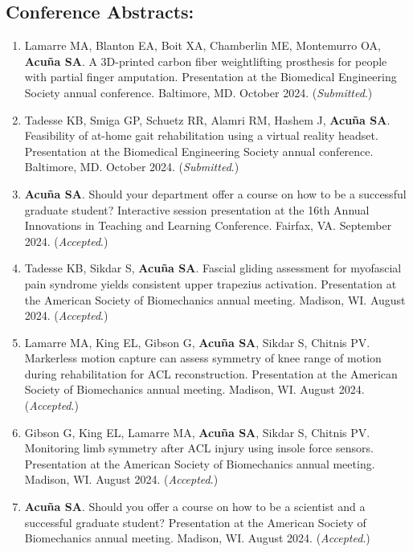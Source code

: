 \documentclass[letterpaper, 10pt]{article}
\begin{document}
\subsection{Conference Abstracts:} %
\begin{enumerate}
    \item Lamarre MA, Blanton EA, Boit XA, Chamberlin ME, Montemurro OA, \textbf{Acuña SA}. A 3D-printed carbon fiber weightlifting prosthesis for people with partial finger amputation. Presentation at the Biomedical Engineering Society annual conference. Baltimore, MD. October 2024. (\textit{Submitted}.)
    \item Tadesse KB, Smiga GP, Schuetz RR, Alamri RM, Hashem J, \textbf{Acuña SA}. Feasibility of at-home gait rehabilitation using a virtual reality headset. Presentation at the Biomedical Engineering Society annual conference. Baltimore, MD. October 2024. (\textit{Submitted}.)
    \item \textbf{Acuña SA}. Should your department offer a course on how to be a successful graduate student? Interactive session presentation at the 16th Annual Innovations in Teaching and Learning Conference. Fairfax, VA. September 2024. (\textit{Accepted}.)
    \item Tadesse KB, Sikdar S, \textbf{Acuña SA}. Fascial gliding assessment for myofascial pain syndrome yields consistent upper trapezius activation. Presentation at the American Society of Biomechanics annual meeting. Madison, WI. August 2024. (\textit{Accepted}.)
    \item Lamarre MA, King EL, Gibson G, \textbf{Acuña SA}, Sikdar S, Chitnis PV. Markerless motion capture can assess symmetry of knee range of motion during rehabilitation for ACL reconstruction. Presentation at the American Society of Biomechanics annual meeting. Madison, WI. August 2024. (\textit{Accepted}.)
    \item Gibson G, King EL, Lamarre MA, \textbf{Acuña SA}, Sikdar S, Chitnis PV. Monitoring limb symmetry after ACL injury using insole force sensors. Presentation at the American Society of Biomechanics annual meeting. Madison, WI. August 2024. (\textit{Accepted}.)   
    \item \textbf{Acuña SA}. Should you offer a course on how to be a scientist and a successful graduate student? Presentation at the American Society of Biomechanics annual meeting. Madison, WI. August 2024. (\textit{Accepted}.)

\end{enumerate}
\end{document}
